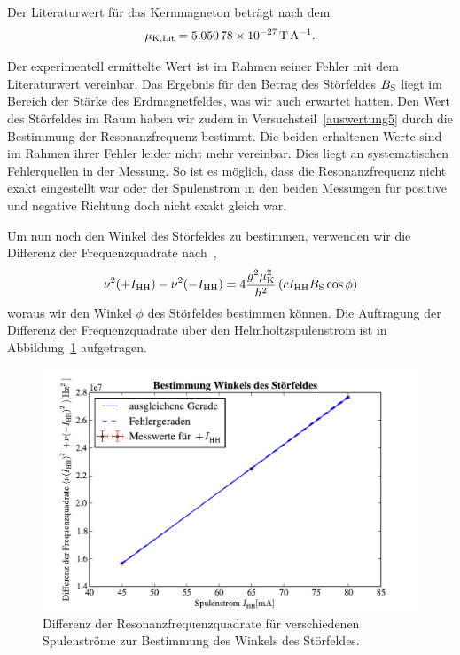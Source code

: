 \documentclass[paper=a4,
	fontsize=10pt,
	DIV=18,
	twocolumn,
	parskip=half
	]{scrartcl}
\numberwithin{equation}{section}    %
\begin{document}
Der Literaturwert für das Kernmagneton beträgt nach dem~\citet{codata}
\begin{equation}
	\mu_{\rm K,Lit} = \SI{5.05078e-27}{\tesla\per\ampere}.
\end{equation}

Der experimentell ermittelte Wert ist im Rahmen seiner Fehler mit dem Literaturwert vereinbar. Das Ergebnis für den Betrag des Störfeldes $B_{\rm S}$ liegt im Bereich der Stärke des Erdmagnetfeldes, was wir auch erwartet hatten. Den Wert des Störfeldes im Raum haben wir zudem in Versuchsteil~\ref{auswertung5} durch die Bestimmung der Resonanzfrequenz bestimmt. Die beiden erhaltenen Werte sind im Rahmen ihrer Fehler leider nicht mehr vereinbar. Dies liegt an systematischen Fehlerquellen in der Messung. So ist es möglich, dass die Resonanzfrequenz nicht exakt eingestellt war oder der Spulenstrom in den beiden Messungen für positive und negative Richtung doch nicht exakt gleich war. 

Um nun noch den Winkel  des Störfeldes zu bestimmen, verwenden wir die Differenz der Frequenzquadrate nach~\citet{anleitung},
\begin{equation}
	\nu^2(+I_{\rm HH}) - \nu^2(-I_{\rm HH}) = 4\frac{g^2\mu_{\rm K}^2}{h^2} \left( c I_{\rm HH} B_{\rm S} \cos\phi \right)
	\label{eq.stoerwinkel}
\end{equation}
woraus wir den Winkel $\phi$ des Störfeldes bestimmen können.
Die Auftragung der Differenz der Frequenzquadrate über den Helmholtzspulenstrom ist in Abbildung~\ref{fig.stoerwinkel} aufgetragen.

\begin{figure}[htp]
	\begin{center}
		\includegraphics[width=\columnwidth]{Data-Plots/10-helmholtz-diff.pdf}
	\caption{Differenz der Resonanzfrequenzquadrate für verschiedenen Spulenströme zur Bestimmung des Winkels des Störfeldes.}
	\label{fig.stoerwinkel}
	\end{center}
\end{figure}
\end{document}

